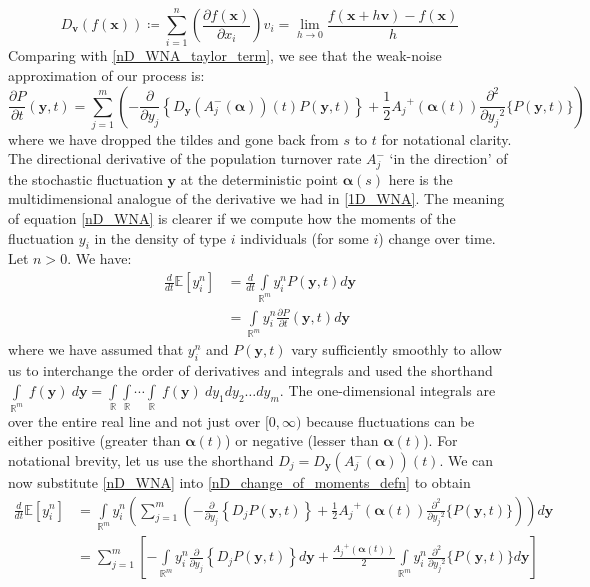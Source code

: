 \begin{equation}
\label{directional_derivative_defn}
D_{\mathbf{v}}(f(\mathbf{x})) \coloneqq \sum\limits_{i=1}^{n}\left(\frac{\partial f(\mathbf{x})}{\partial x_i}\right)v_i = \lim_{h \to 0}\frac{f(\mathbf{x}+h\mathbf{v})-f(\mathbf{x})}{h}
\end{equation}
Comparing with \eqref{nD_WNA_taylor_term}, we see that the weak-noise approximation of our process is:
\begin{equation}
\label{nD_WNA}
\frac{\partial P}{\partial t}(\mathbf{y},t) = \sum\limits_{j=1}^{m}\left(-\frac{\partial}{\partial y_j}\left\{D_{\mathbf{y}}(A_j^-(\boldsymbol{\alpha}))(t)P(\mathbf{y},t)\right\}+\frac{1}{2}{A_j}^{+}(\boldsymbol{\alpha}(t))\frac{\partial^2}{\partial{y_j}^2}\{P(\mathbf{y},t)\}\right)
\end{equation}
where we have dropped the tildes and gone back from $s$ to $t$ for notational clarity. The directional derivative of the population turnover rate $A_j^-$ `in the direction' of the stochastic fluctuation $\mathbf{y}$ at the deterministic point $\boldsymbol{\alpha}(s)$ here is the multidimensional analogue of the derivative we had in \eqref{1D_WNA}. The meaning of equation \eqref{nD_WNA} is clearer if we compute how the moments of the fluctuation $y_i$ in the density of type $i$ individuals (for some $i$) change over time. Let $n > 0$. We have:
\begin{align}
\frac{d}{dt}\mathbb{E}[y_i^n] &= \frac{d}{dt}\int\limits_{\mathbb{R}^m}y_i^nP(\mathbf{y},t)d\mathbf{y}\\
&= \int\limits_{\mathbb{R}^m}y_i^n\frac{\partial P}{\partial t}(\mathbf{y},t)d\mathbf{y}\label{nD_change_of_moments_defn}
\end{align}
where we have assumed that $y_i^n$ and $P(\mathbf{y},t)$ vary sufficiently smoothly to allow us to interchange the order of derivatives and integrals and used the shorthand $\displaystyle \int\limits_{\mathbb{R}^m} \ f(\mathbf{y}) \ d\mathbf{y} = \int\limits_{\mathbb{R}}\int\limits_{\mathbb{R}}\cdots\int\limits_{\mathbb{R}} \ f(\mathbf{y}) \ dy_1 dy_2 \ldots dy_m$. The one-dimensional integrals are over the entire real line and not just over $[0,\infty)$ because fluctuations can be either positive (greater than $\boldsymbol{\alpha}(t)$) or negative (lesser than $\boldsymbol{\alpha}(t)$). For notational brevity, let us use the shorthand $D_j = D_{\mathbf{y}}(A_j^-(\boldsymbol{\alpha}))(t)$. We can now substitute \eqref{nD_WNA} into \eqref{nD_change_of_moments_defn} to obtain
\begin{align}
\frac{d}{dt}\mathbb{E}[y_i^n] &= \int\limits_{\mathbb{R}^m} y_i^n \left(\sum\limits_{j=1}^{m}\left(-\frac{\partial}{\partial y_j}\left\{D_{j}P(\mathbf{y},t)\right\}+\frac{1}{2}{A_j}^{+}(\boldsymbol{\alpha}(t))\frac{\partial^2}{\partial{y_j}^2}\{P(\mathbf{y},t)\}\right)\right)d\mathbf{y}\\
&= \sum\limits_{j=1}^{m}\left[-\int\limits_{\mathbb{R}^m} y_i^n\frac{\partial}{\partial y_j}\left\{D_{j}P(\mathbf{y},t)\right\}d\mathbf{y} + \frac{{A_j}^{+}(\boldsymbol{\alpha}(t))}{2}\int\limits_{\mathbb{R}^m} y_i^n\frac{\partial^2}{\partial{y_j}^2}\{P(\mathbf{y},t)\}d\mathbf{y}\right]\label{nD_intermediate_for_moments}
\end{align}
